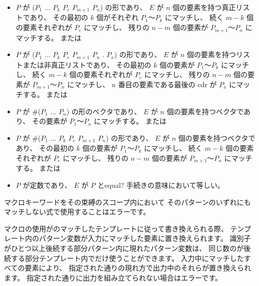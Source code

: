 \begin{entry}
\begin{itemize}
\item $P$ が
      {\cf ($P_1$ $\dots$ $P_k$ $P_e$  $P_{m+1}$ \dotsfoo{} $P_n$)}
      の形であり、
      $E$ が $n$ 個の要素を持つ真正リストであり、
      その最初の $k$ 個がそれぞれ $P_1$〜$P_k$ にマッチし、
      続く $m-k$ 個の要素それぞれが $P_e$ にマッチし、
      残りの $n-m$ 個の要素が $P_{m+1}$〜$P_n$ にマッチする。
      または

\item $P$ が
      {\cf ($P_1$ $\dots$ $P_k$ $P_{e}$  $P_{m+1}$ \dotsfoo{} $P_n$ . $P_x$)}
      の形であり、
      $E$ が $n$ 個の要素を持つリストまたは非真正リストであり、
      その最初の $k$ 個の要素が $P_1$〜$P_k$ にマッチし、
      続く $m-k$ 個の要素それぞれが $P_e$ にマッチし、
      残りの $n-m$ 個の要素が $P_{m+1}$〜$P_n$ にマッチし、
      $n$ 番目の要素である最後の cdr が $P_x$ にマッチする。
      または

\item $P$ が {\cf \#($P_1$ $\dots$ $P_n$)} の形のベクタであり、
      $E$ が $n$ 個の要素を持つベクタであり、
      その要素が $P_1$〜$P_n$ にマッチする。
      または

\item $P$ が
      {\cf \#($P_1$ $\dots$ $P_k$ $P_{e}$  $P_{m+1}$ \dotsfoo $P_n$)}
      の形であり、
      $E$ が $n$ 個の要素を持つベクタであり、
      その最初の $k$ 個の要素が $P_1$〜$P_k$ にマッチし、
      続く $m-k$ 個の要素それぞれが $P_e$ にマッチし、
      残りの $n-m$ 個の要素が $P_{m+1}$〜$P_n$ にマッチする。
      または

\item $P$ が定数であり、 $E$ が $P$ と{\cf equal?} 手続きの意味において等しい。
\end{itemize}

マクロキーワードをその束縛のスコープ内において
そのパターンのいずれにもマッチしない式で使用することはエラーです。

マクロの使用がのマッチしたテンプレートに従って書き換えられる際、
テンプレート内のパターン変数が入力にマッチした要素に置き換えられます。
識別子がひとつ以上後続する部分パターン内に現れたパターン変数は、
同じ数のが後続する部分テンプレート内でだけ使うことができます。
入力中にマッチしたすべての要素により、
指定された通りの現れ方で出力中のそれらが置き換えられます。
指定された通りに出力を組み立てられない場合はエラーです。



\end{entry}
